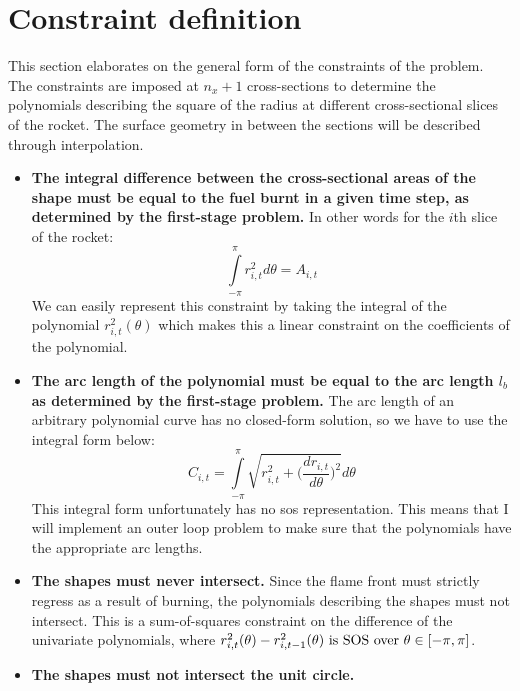    \section{Constraint definition}
   \label{sec:generalconstraints}

    This section elaborates on the general form of the constraints of the problem.
    The constraints are imposed at $n_x+1$ cross-sections to determine the polynomials describing
    the square of the radius at different cross-sectional slices of the rocket.
    The surface geometry in between the sections will be described through interpolation.

    \begin{itemize}
        \item \textbf{The integral difference between the cross-sectional areas of the shape must be equal
        to the fuel burnt in a given time step, as determined by the first-stage problem.} In other words
        for the $i$th slice of the rocket:
        \begin{equation}
            \int\limits_{-\pi}^{\pi} r_{i,t}^2 d\theta = A_{i,t}
        \end{equation}
        We can easily represent this constraint by taking the integral of the polynomial $r_{i,t}^2(\theta)$
        which makes this a linear constraint on the coefficients of the polynomial.
        \item \textbf{The arc length of the polynomial must be equal to the arc length $l_b$ as determined
        by the first-stage problem.} The arc length of an arbitrary polynomial curve has no closed-form solution, so we
        have to use the integral form below:
        \begin{equation}
            C_{i,t} = \int\limits_{-\pi}^{\pi} \sqrt{r_{i,t}^2 + \Big(\frac{dr_{i,t}}{d\theta}\Big)^2} d\theta
        \end{equation}
        This integral form unfortunately has no \gls{sos} representation. This means
        that I will implement an outer loop problem to make sure that the polynomials
        have the appropriate arc lengths.
        \item \textbf{The shapes must never intersect.}
        Since the flame front must strictly regress as a result of burning,
        the polynomials describing the shapes must not intersect.
        This is a sum-of-squares constraint on the difference of the univariate polynomials, where
        $r^2_{i,t}(\theta) - r^2_{i,t-1}(\theta) \rm{~is~SOS~over~} \theta \in [-\pi, \pi]$.
        \item\textbf{The shapes must not intersect the unit circle.}

\end{itemize}
